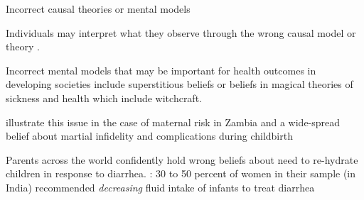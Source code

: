 \documentclass[aspectratio=169, 10pt, handout]{beamer}
\newenvironment{wideitemize}{\itemize\addtolength{\itemsep}{10pt}}{\enditemize}
\begin{document}
\begin{frame}{Incorrect causal theories or mental models}

\begin{wideitemize}

	\item Individuals may interpret what they observe through the wrong causal model or theory \citep{schwartzstein2014selective,gagnon2017channeled}.
	
	\item Incorrect mental models that may be important for health outcomes in developing societies include superstitious beliefs or beliefs in magical theories of sickness and health which include witchcraft.
	
	\item \cite{ashraf2017traditional} illustrate this issue in the case of maternal risk in Zambia and a wide-spread belief about martial infidelity and complications during childbirth

	\item Parents across the world confidently hold wrong beliefs about need to re-hydrate  children in response to diarrhea. \cite{datta2014behavioral}: 30 to 50 percent of women in their sample (in India) recommended \textit{decreasing} fluid intake of infants to treat diarrhea


\end{wideitemize}

\end{frame}
\end{document}
